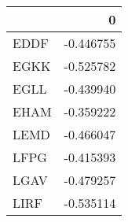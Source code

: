 \begin{tabular}{lr}
\toprule
{} &         0 \\
\midrule
EDDF & -0.446755 \\
EGKK & -0.525782 \\
EGLL & -0.439940 \\
EHAM & -0.359222 \\
LEMD & -0.466047 \\
LFPG & -0.415393 \\
LGAV & -0.479257 \\
LIRF & -0.535114 \\
\bottomrule
\end{tabular}
